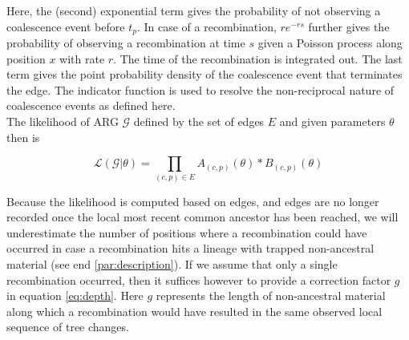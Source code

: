 \documentclass{article}
\begin{document}
Here, the (second) exponential term gives the probability of not observing a 
coalescence event before $t_p$. In case of a recombination, $re^{-rs}$ further 
gives the probability of observing a recombination 
at time $s$ given a Poisson process along position $x$ with rate $r$. The 
time of the recombination is integrated out.
The last term gives the point probability density of the coalescence event 
that terminates the edge. The indicator function is used to resolve 
the non-reciprocal nature of coalescence events as defined here.\\

The likelihood of ARG $\mathcal{G}$ defined by the set of edges $E$ and
given parameters $\theta$ then is

\begin{equation}\label{eq:full-lik}
\mathcal{L}(\mathcal{G}|\theta) = \prod_{(c, p) \in E} A_{(c, p)}(\theta) * B_{(c, p)}(\theta)
\end{equation}


Because the likelihood is computed based on edges,
and edges are no longer recorded once the local most recent common ancestor 
has been reached, we will underestimate the number of positions where 
a recombination could have occurred in case a recombination hits a 
lineage with trapped non-ancestral material (see end \ref{par:description}). 
If we assume that only a single recombination 
occurred, then it suffices however to provide a correction factor $g$ in equation
\ref{eq:depth}. Here $g$ represents the 
length of non-ancestral material along which a recombination would have resulted  
in the same observed local sequence of tree changes.
\end{document}
